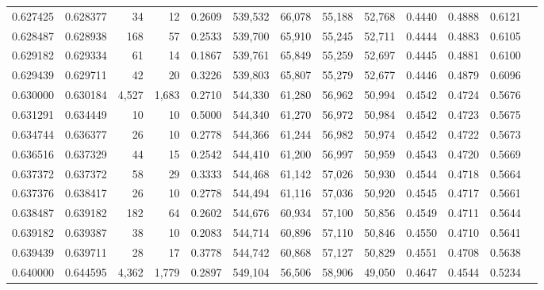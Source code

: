 \begin{tabular}{rrrrrrrrrrrrr}
0.627425 & 0.628377 &     34 &    12 &                                     0.2609 & 539,532 &  66,078 &  55,188 &  52,768 & 0.4440 & 0.4888 & 0.6121 \\
0.628487 & 0.628938 &    168 &    57 &                                     0.2533 & 539,700 &  65,910 &  55,245 &  52,711 & 0.4444 & 0.4883 & 0.6105 \\
0.629182 & 0.629334 &     61 &    14 &                                     0.1867 & 539,761 &  65,849 &  55,259 &  52,697 & 0.4445 & 0.4881 & 0.6100 \\
0.629439 & 0.629711 &     42 &    20 &                                     0.3226 & 539,803 &  65,807 &  55,279 &  52,677 & 0.4446 & 0.4879 & 0.6096 \\
0.630000 & 0.630184 &  4,527 & 1,683 &                                     0.2710 & 544,330 &  61,280 &  56,962 &  50,994 & 0.4542 & 0.4724 & 0.5676 \\
0.631291 & 0.634449 &     10 &    10 &                                     0.5000 & 544,340 &  61,270 &  56,972 &  50,984 & 0.4542 & 0.4723 & 0.5675 \\
0.634744 & 0.636377 &     26 &    10 &                                     0.2778 & 544,366 &  61,244 &  56,982 &  50,974 & 0.4542 & 0.4722 & 0.5673 \\
0.636516 & 0.637329 &     44 &    15 &                                     0.2542 & 544,410 &  61,200 &  56,997 &  50,959 & 0.4543 & 0.4720 & 0.5669 \\
0.637372 & 0.637372 &     58 &    29 &                                     0.3333 & 544,468 &  61,142 &  57,026 &  50,930 & 0.4544 & 0.4718 & 0.5664 \\
0.637376 & 0.638417 &     26 &    10 &                                     0.2778 & 544,494 &  61,116 &  57,036 &  50,920 & 0.4545 & 0.4717 & 0.5661 \\
0.638487 & 0.639182 &    182 &    64 &                                     0.2602 & 544,676 &  60,934 &  57,100 &  50,856 & 0.4549 & 0.4711 & 0.5644 \\
0.639182 & 0.639387 &     38 &    10 &                                     0.2083 & 544,714 &  60,896 &  57,110 &  50,846 & 0.4550 & 0.4710 & 0.5641 \\
0.639439 & 0.639711 &     28 &    17 &                                     0.3778 & 544,742 &  60,868 &  57,127 &  50,829 & 0.4551 & 0.4708 & 0.5638 \\
0.640000 & 0.644595 &  4,362 & 1,779 &                                     0.2897 & 549,104 &  56,506 &  58,906 &  49,050 & 0.4647 & 0.4544 & 0.5234 \\

\end{tabular}

